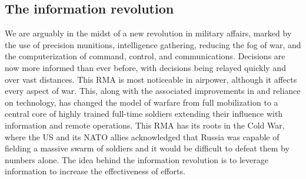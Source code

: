 \documentclass[nobib]{tufte-handout}
\begin{document}
\subsection{The information revolution}

We are arguably in the midst of a new revolution 
in military affairs, marked by the use of precision munitions, 
intelligence gathering, reducing the fog of war, 
and the computerization of command, control, and 
communications. Decisions are now more informed 
than ever before, with decisions being relayed quickly and 
over vast distances. This RMA is most noticeable in 
airpower, although it affects every aspect of war. 
This, along with the associated improvements 
in and reliance on technology, has changed the 
model of warfare from full mobilization to a central 
core of highly trained full-time soldiers extending 
their influence with information and remote operations. 
This RMA has its roots in the Cold War, where the US 
and its NATO allies acknowledged that Russia was 
capable of fielding a massive swarm of soldiers 
and it would be difficult to defeat them by numbers alone. 
The idea behind the information revolution is 
to leverage information to increase the effectiveness 
of efforts. 
\end{document}
